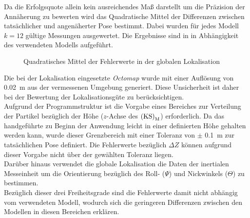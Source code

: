 %

Da die Erfolgsquote allein kein ausreichendes Maß darstellt um die Präzision der Annäherung zu bewerten wird das Quadratische Mittel der Differenzen zwischen tatsächlicher und angenäherter Pose bestimmt. Dabei wurden für jedes Modell $k=12$ gültige Messungen ausgewertet. Die Ergebnisse sind in  in Abhängigkeit des verwendeten Modells aufgeführt.\\



\begin{figure}

\caption{Quadratisches Mittel der Fehlerwerte in der globalen Lokalisation}
\label{fig.glob_loc}
\end{figure}

Die bei der Lokalisation eingesetzte \textit{Octomap} wurde mit einer Auflösung von \SI{0,02}{\meter} aus der vermessenen Umgebung generiert. Diese Unsicherheit ist daher bei der Bewertung der Lokalisationsgüte zu berücksichtigen.\\
Aufgrund der Programmstruktur ist die Vorgabe eines Bereiches zur Verteilung der Partikel bezüglich der Höhe ($z$-Achse des ${\mathrm{(KS)}}_{\mathrm{M}}$) erforderlich. Da das handgeführte \kps{} zu Beginn der Anwendung leicht in einer definierten Höhe gehalten werden kann, wurde dieser Grenzbereich mit einer Toleranz von $\pm$ \SI{0,1}{\meter} zur tatsächlichen Pose definiert. Die Fehlerwerte bezüglich $\Delta Z$ können aufgrund dieser Vorgabe nicht über der gewählten Toleranz liegen.\\
Darüber hinaus verwendet die globale Lokalisation die Daten der inertialen Messeinheit um die Orientierung bezüglich des Roll- ($\Psi$) und Nickwinkels ($\Theta$) zu bestimmen.\\
Bezüglich dieser drei Freiheitsgrade sind die Fehlerwerte damit nicht abhängig vom verwendeten Modell, wodurch sich die geringeren Differenzen zwischen den Modellen in diesen Bereichen erklären.\\

